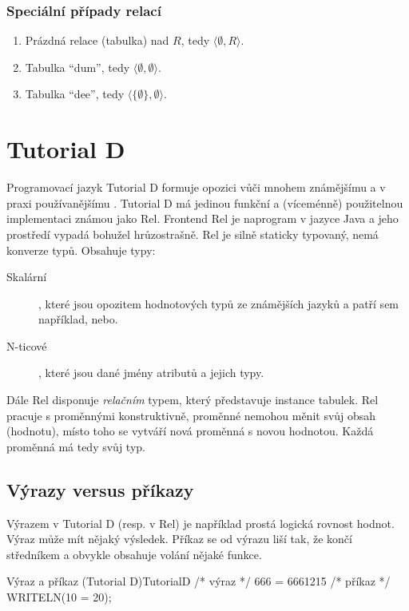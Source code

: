 \subsubsection{Speciální případy relací}
\begin{enumerate}
\item Prázdná relace (tabulka) nad $R$, tedy $\langle \emptyset, R \rangle$.
\item Tabulka \enquote{dum}, tedy $\langle \emptyset, \emptyset \rangle$.
\item Tabulka \enquote{dee}, tedy $\langle \lbrace \emptyset \rbrace, \emptyset \rangle$.
\end{enumerate}

\section{Tutorial D}
Programovací jazyk Tutorial D formuje opozici vůči mnohem známějšímu a v praxi používanějšímu . Tutorial D má jedinou funkční a (víceménně) použitelnou implementaci známou jako Rel. Frontend Rel je naprogram v jazyce Java a jeho prostředí vypadá bohužel hrůzostrašně. Rel je silně staticky typovaný, nemá konverze typů. Obsahuje typy:
\begin{description}
\item[Skalární], které jsou opozitem hodnotových typů ze známějších jazyků a patří sem například, nebo.
\item[N-ticové], které jsou dané jmény atributů a jejich typy.
\end{description}
Dále Rel disponuje \textit{relačním} typem, který představuje instance tabulek. Rel pracuje s proměnnými konstruktivně, proměnné nemohou měnit svůj obsah (hodnotu), místo toho se vytváří nová proměnná s novou hodnotou. Každá proměnná má tedy svůj typ.

\subsection{Výrazy versus příkazy}
Výrazem v Tutorial D (resp. v Rel) je například prostá logická rovnost hodnot. Výraz může mít nějaký výsledek. Příkaz se od výrazu liší tak, že končí středníkem a obvykle obsahuje volání nějaké funkce.
\begin{upcode}{Výraz a příkaz (Tutorial D)}{}{TutorialD}
/* výraz */
666 = 6661215
/* příkaz */
WRITELN(10 = 20);
\end{upcode}

